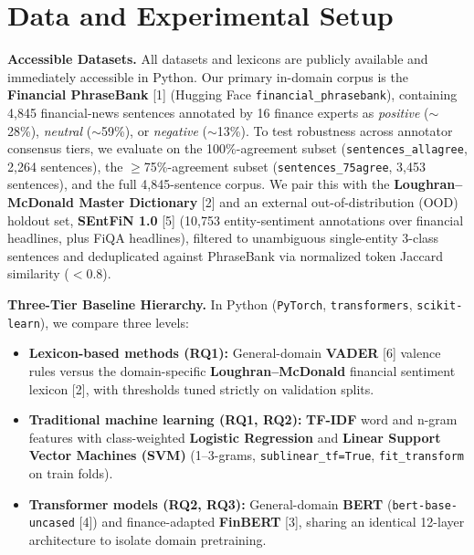 \documentclass[11pt,a4paper]{article}
\begin{document}
\section*{Data and Experimental Setup}
\textbf{Accessible Datasets.} All datasets and lexicons are publicly available and immediately accessible in Python. Our primary in-domain corpus is the \textbf{Financial PhraseBank} [1] (Hugging Face \texttt{financial\_phrasebank}), containing 4,845 financial-news sentences annotated by 16 finance experts as \textit{positive} ($\sim$28\%), \textit{neutral} ($\sim$59\%), or \textit{negative} ($\sim$13\%). To test robustness across annotator consensus tiers, we evaluate on the 100\%-agreement subset (\texttt{sentences\_allagree}, 2,264 sentences), the $\ge$75\%-agreement subset (\texttt{sentences\_75agree}, 3,453 sentences), and the full 4,845-sentence corpus. We pair this with the \textbf{Loughran--McDonald Master Dictionary} [2] and an external out-of-distribution (OOD) holdout set, \textbf{SEntFiN 1.0} [5] (10,753 entity-sentiment annotations over financial headlines, plus FiQA headlines), filtered to unambiguous single-entity 3-class sentences and deduplicated against PhraseBank via normalized token Jaccard similarity ($< 0.8$).

\textbf{Three-Tier Baseline Hierarchy.} In Python (\texttt{PyTorch}, \texttt{transformers}, \texttt{scikit-learn}), we compare three levels:
\begin{itemize}[topsep=1pt,itemsep=1pt,parsep=0pt,leftmargin=1.5em]
    \item \textbf{Lexicon-based methods (RQ1):} General-domain \textbf{VADER} [6] valence rules versus the domain-specific \textbf{Loughran--McDonald} financial sentiment lexicon [2], with thresholds tuned strictly on validation splits.
    \item \textbf{Traditional machine learning (RQ1, RQ2):} \textbf{TF-IDF} word and n-gram features with class-weighted \textbf{Logistic Regression} and \textbf{Linear Support Vector Machines (SVM)} (1--3-grams, \texttt{sublinear\_tf=True}, \texttt{fit\_transform} on train folds).
    \item \textbf{Transformer models (RQ2, RQ3):} General-domain \textbf{BERT} (\texttt{bert-base-uncased} [4]) and finance-adapted \textbf{FinBERT} [3], sharing an identical 12-layer architecture to isolate domain pretraining.
\end{itemize}
\end{document}
